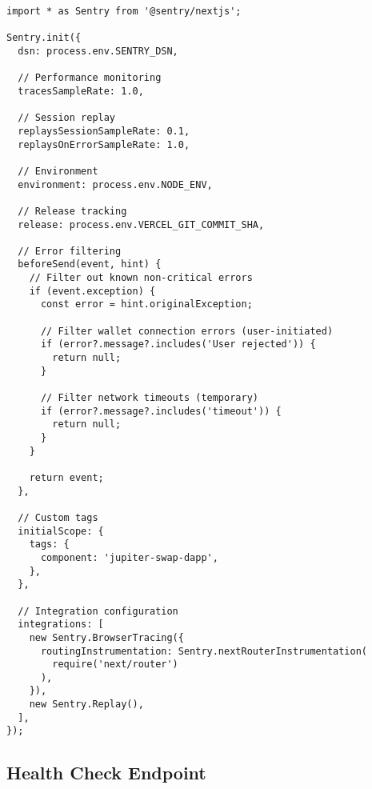 \documentclass[11pt,a4paper]{article}
\begin{document}
\begin{lstlisting}[style=bash, caption=sentry.client.config.ts]
import * as Sentry from '@sentry/nextjs';

Sentry.init({
  dsn: process.env.SENTRY_DSN,
  
  // Performance monitoring
  tracesSampleRate: 1.0,
  
  // Session replay
  replaysSessionSampleRate: 0.1,
  replaysOnErrorSampleRate: 1.0,
  
  // Environment
  environment: process.env.NODE_ENV,
  
  // Release tracking
  release: process.env.VERCEL_GIT_COMMIT_SHA,
  
  // Error filtering
  beforeSend(event, hint) {
    // Filter out known non-critical errors
    if (event.exception) {
      const error = hint.originalException;
      
      // Filter wallet connection errors (user-initiated)
      if (error?.message?.includes('User rejected')) {
        return null;
      }
      
      // Filter network timeouts (temporary)
      if (error?.message?.includes('timeout')) {
        return null;
      }
    }
    
    return event;
  },
  
  // Custom tags
  initialScope: {
    tags: {
      component: 'jupiter-swap-dapp',
    },
  },
  
  // Integration configuration
  integrations: [
    new Sentry.BrowserTracing({
      routingInstrumentation: Sentry.nextRouterInstrumentation(
        require('next/router')
      ),
    }),
    new Sentry.Replay(),
  ],
});
\end{lstlisting}

\subsection{Health Check Endpoint}
\end{document}
